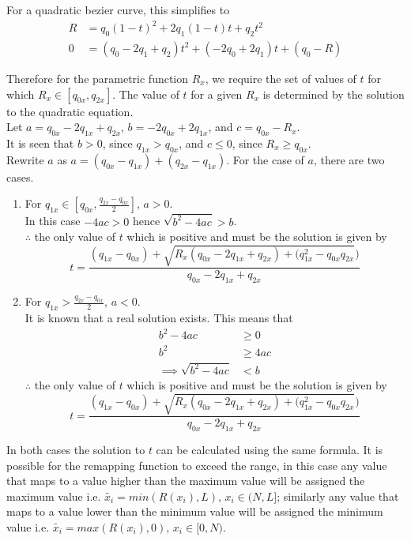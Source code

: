 \begin{definition}
	For a quadratic bezier curve, this simplifies to
	\begin{align*}
		R &= q_0(1-t)^2 + 2q_1(1-t)t + q_2t^2 \\
		0 &= (q_0-2q_1+q_2)t^2 + (-2q_0+2q_1)t + (q_0-R)
	\end{align*}
	
	Therefore for the parametric function $R_x$, we require the set of values of $t$ for which $R_x \in [q_{0x},q_{2x}]$. The value of $t$ for a given $R_x$ is determined by the solution to the quadratic equation.\\
	Let $a=q_{0x}-2q_{1x}+q_{2x}$, $b=-2q_{0x}+2q_{1x}$, and $c=q_{0x}-R_x$.\\
	It is seen that $b>0$, since $q_{1x} > q_{0x}$, and $c \leq 0$, since $R_x \geq q_{0x}$.\\
	Rewrite $a$ as $a=(q_{0x}-q_{1x}) + (q_{2x}-q_{1x})$.
	For the case of $a$, there are two cases.
	
	\begin{enumerate}
		\item
		For $q_{1x} \in [q_{0x}, \frac{q_{2x}-q_{0x}}{2}]$, $a>0$.\\
		In this case $-4ac>0$ hence $\sqrt{b^2-4ac}>b$.\\
		$\therefore$ the only value of $t$ which is positive and must be the solution is given by
		\begin{equation}\label{eq:qt1}
			t =  \frac{(q_{1x}-q_{0x}) + \sqrt{R_x(q_{0x}-2q_{1x}+q_{2x})+(q_{1x}^2-q_{0x}q_{2x}})}{q_{0x}-2q_{1x}+q_{2x}}
		\end{equation}

		\item
		For $q_{1x}>\frac{q_{2x}-q_{0x}}{2}$, $a<0$.\\
		It is known that a real solution exists. This means that
		\begin{align*}
			b^2 -4ac &\geq 0 \\
			b^2 &\geq 4ac \\
			\implies \sqrt{b^2-4ac} &< b
		\end{align*}
		$\therefore$ the only value of $t$ which is positive and must be the solution is given by
		\begin{equation}\label{eq:qt2}
			t =  \frac{(q_{1x}-q_{0x}) + \sqrt{R_x(q_{0x}-2q_{1x}+q_{2x})+(q_{1x}^2-q_{0x}q_{2x}})}{q_{0x}-2q_{1x}+q_{2x}}
		\end{equation}
	\end{enumerate}

	In both cases the solution to $t$ can be calculated using the same formula.
	It is possible for the remapping function to exceed the range, in this case any value that maps to a value higher than the maximum value will be assigned the maximum value i.e. $\widetilde{x_i} = min(R(x_i),L), \,  x_i \in (N,L]$; similarly any value that maps to a value lower than the minimum value will be assigned the minimum value i.e. $\widetilde{x_i} = max(R(x_i),0), \, x_i \in [0,N)$.
\end{definition}

